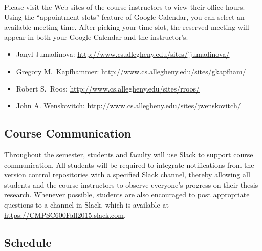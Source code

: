 Please visit the Web sites of the course instructors to view their office hours.  Using the ``appointment slots''
feature of Google Calendar, you can select an available meeting time. After picking your time slot, the reserved meeting
will appear in both your Google Calendar and the instructor's.

\vspace*{-.1in}
\begin{itemize}
    \itemsep -.25em
        \item Janyl Jumadinova: \url{http://www.cs.allegheny.edu/sites/jjumadinova/}
        \item Gregory M.\ Kapfhammer: \url{http://www.cs.allegheny.edu/sites/gkapfham/}
        \item Robert S.\ Roos: \url{http://www.cs.allegheny.edu/sites/rroos/}
        \item John A. Wenskovitch: \url{http://www.cs.allegheny.edu/sites/jwenskovitch/}
\end{itemize}

\vspace*{-.25in}
\subsection*{Course Communication}

Throughout the semester, students and faculty will use Slack to support course communication. All students will be
required to integrate notifications from the version control repositories with a specified Slack channel, thereby
allowing all students and the course instructors to observe everyone's progress on their thesis research.  Whenever
possible, students are also encouraged to post appropriate questions to a channel in Slack, which is available at
\url{https://CMPSC600Fall2015.slack.com}.

\vspace*{-.1in}
\subsection*{Schedule}

